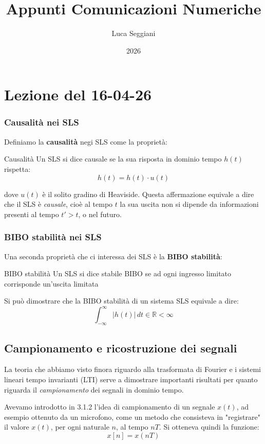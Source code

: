 \documentclass[a4paper,11pt]{article}
\title{Appunti Comunicazioni Numeriche}
\author{Luca Seggiani}
\date{2026}
\begin{document}
\section{Lezione del 16-04-26}

\thispagestyle{empty}
\pagestyle{fancy}

\subsubsection{Causalità nei SLS}
Definiamo la \textbf{causalità} negi SLS come la proprietà:
\begin{definition}{Causalità}
Un SLS si dice causale se la sua risposta in dominio tempo $h(t)$ rispetta: 
$$
h(t) = h(t) \cdot u(t)
$$
\end{definition}
dove $u(t)$ è il solito gradino di Heaviside. Questa affermazione equivale a dire che il SLS è \textit{causale}, cioè al tempo $t$ la sua uscita non si dipende da informazioni presenti al tempo $t' > t$, o nel futuro. 

\subsubsection{BIBO stabilità nei SLS}
Una seconda proprietà che ci interessa dei SLS è la \textbf{BIBO stabilità}:
\begin{definition}{BIBO stabilità}
Un SLS si dice stabile BIBO se ad ogni ingresso limitato corrisponde un’uscita limitata
\end{definition}

Si può dimostrare che la BIBO stabilità di un sistema SLS equivale a dire:
$$
\int_{-\infty}^{\infty} |h(t)| \, dt \in \mathbb{R} < \infty
$$

\subsection{Campionamento e ricostruzione dei segnali}
La teoria che abbiamo visto finora riguardo alla trasformata di Fourier e i sistemi lineari tempo invarianti (LTI) serve a dimostrare importanti risultati per quanto riguarda il \textit{campionamento} dei segnali in dominio tempo. 

Avevamo introdotto in 3.1.2 l'idea di campionamento di un segnale $x(t)$, ad esempio ottenuto da un microfono, come un metodo che consisteva in "registrare" il valore $x(t)$, per ogni naturale $n$, al tempo $nT$. Si otteneva quindi la funzione:
$$
x[n] = x(nT)
$$
\end{document}
